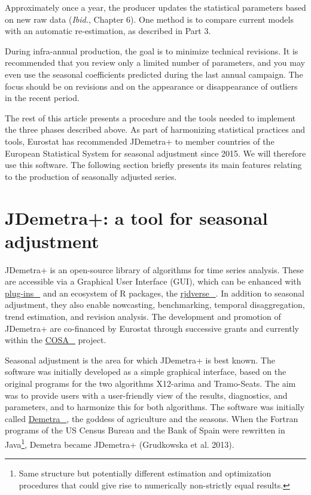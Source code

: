 \documentclass[
  letterpaper,
  DIV=11,
  numbers=noendperiod]{scrreprt}
\begin{document}
Approximately once a year, the producer updates the statistical
parameters based on new raw data (\emph{Ibid.}, Chapter 6). One method
is to compare current models with an automatic re-estimation, as
described in Part 3.

During infra-annual production, the goal is to minimize technical
revisions. It is recommended that you review only a limited number of
parameters, and you may even use the seasonal coefficients predicted
during the last annual campaign. The focus should be on revisions and on
the appearance or disappearance of outliers in the recent period.

The rest of this article presents a procedure and the tools needed to
implement the three phases described above. As part of harmonizing
statistical practices and tools, Eurostat has recommended JDemetra+ to
member countries of the European Statistical System for seasonal
adjustment since 2015. We will therefore use this software. The
following section briefly presents its main features relating to the
production of seasonally adjusted series.

\hypertarget{jdemetra-a-tool-for-seasonal-adjustment}{%
\section*{JDemetra+: a tool for seasonal
adjustment}\label{jdemetra-a-tool-for-seasonal-adjustment}}


JDemetra+ is an open-source library of algorithms for time series
analysis. These are accessible via a Graphical User Interface (GUI),
which can be enhanced with
\href{https://doc.jdemetra.org/t-plug-ins}{plug-ins~🔗} and an ecosystem
of R packages, the
\href{https://github.com/rjdverse?view_as=public}{rjdverse~🔗}. In
addition to seasonal adjustment, they also enable nowcasting,
benchmarking, temporal disaggregation, trend estimation, and revision
analysis. The development and promotion of JDemetra+ are co-financed by
Eurostat through successive grants and currently within the
\href{https://doc.jdemetra.org/\#COSA-abstract}{COSA~🔗} project.

Seasonal adjustment is the area for which JDemetra+ is best known. The
software was initially developed as a simple graphical interface, based
on the original programs for the two algorithms X12-arima and
Tramo-Seats. The aim was to provide users with a user-friendly view of
the results, diagnostics, and parameters, and to harmonize this for both
algorithms. The software was initially called
\href{https://github.com/cosa-tsa-shop/Resources-Logistics/tree/main/Historical\%20Documents}{Demetra~🔗},
the goddess of agriculture and the seasons. When the Fortran programs of
the US Census Bureau and the Bank of Spain were rewritten in
Java\footnote{Same structure but potentially different estimation and optimization procedures that could give rise to numerically non-strictly equal results.},
Demetra became JDemetra+ (Grudkowska et al. 2013).
\end{document}
